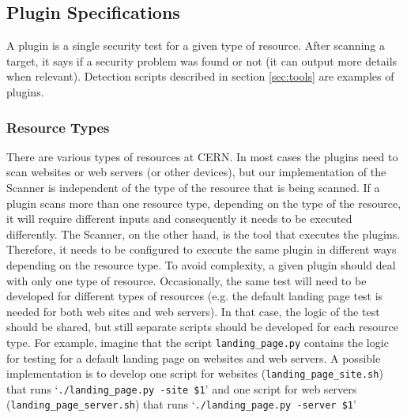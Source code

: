 \subsection{Plugin Specifications}
A plugin is a single security test for a given type of resource. After scanning a target, it says if a security problem was found or not (it can output more details when relevant). Detection scripts described in section \ref{sec:tools} are examples of plugins.
\subsubsection{Resource Types}
There are various types of resources at CERN. In most cases the plugins need to scan websites or web servers (or other devices), but our implementation of the Scanner is independent of the type of the resource that is being scanned. If a plugin scans more than one resource type, depending on the type of the resource, it will require different inputs and consequently it needs to be executed differently. The Scanner, on the other hand, is the tool that executes the plugins. Therefore, it needs to be configured to execute the same plugin in different ways depending on the resource type. To avoid complexity, a given plugin should deal with only one type of resource. Occasionally, the same test will need to be developed for different types of resources (e.g. the default landing page test is needed for both web sites and web servers). In that case, the logic of the test should be shared, but still separate scripts should be developed for each resource type. For example, imagine that the script \texttt{landing\_page.py} contains the logic for testing for a default landing page on websites and web servers. A possible implementation is to develop one script for websites (\texttt{landing\_page\_site.sh}) that runs `\texttt{./landing\_page.py -site \$1}' and one script for web servers (\texttt{landing\_page\_server.sh}) that runs `\texttt{./landing\_page.py -server \$1}' 
